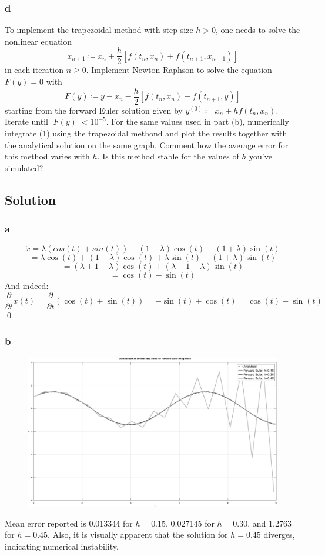 \documentclass[11pt]{report}
\theoremstyle{definition}
\begin{document}
\subsubsection*{d}
To implement the trapezoidal method with step-size $h>0$, one needs to solve the
nonlinear equation
\[x_{n+1}\coloneqq x_n + \frac{h}{2}[f(t_n,x_n)+f(t_{n+1},x_{n+1})]\]
in each iteration $n\geq 0$. Implement Newton-Raphson to solve the equation $F(y)=0$ with
\[ F(y)\coloneqq y-x_n-\frac{h}{2}[f(t_n,x_n)+f(t_{n+1},y)] \]
starting from the forward Euler solution given by $y^{(0)}\coloneqq x_n+hf(t_n,x_n)$.
Iterate until $|F(y)|<10^{-5}$. For the same values used in part (b), numerically
integrate (1) using the trapezoidal methond and plot the results together with the
analytical solution on the same graph. Comment how the average error for this method
varies with $h$. Is this method stable for the values of $h$ you've simulated?

\subsection*{Solution}
\subsubsection*{a}
\[ \dot{x} = \lambda(cos(t)+sin(t))+(1-\lambda)\cos(t)-(1+\lambda)\sin(t) \]
\[ = \lambda\cos(t)+(1-\lambda)\cos(t)+\lambda\sin(t)-(1+\lambda)\sin(t) \]
\[=(\lambda+1-\lambda)\cos(t)+(\lambda-1-\lambda)\sin(t)\]
\[=\cos(t)-\sin(t)\]
And indeed:
\[
	\frac{\partial}{\partial t} x(t)
	= \frac{\partial}{\partial t}(\cos(t) +\sin(t))
	= -\sin(t)+\cos(t)
	= \cos(t)-\sin(t)
\]
\qed
\subsubsection*{b}
\begin{figure}[h]
	\includegraphics[width=\textwidth]{forward_euler}
\end{figure}
Mean error reported is 0.013344 for $h=0.15$, 0.027145 for $h=0.30$, and 1.2763
for $h=0.45$. Also, it is visually apparent that the solution for $h=0.45$
diverges, indicating numerical instability.
\newpage
\end{document}
